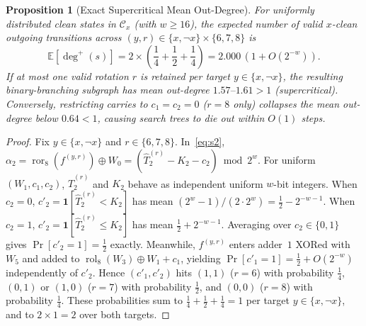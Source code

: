 \documentclass[11pt,a4paper]{article}
\newtheorem{proposition}[theorem]{Proposition}
\theoremstyle{definition}
\theoremstyle{remark}
\newcommand{\ror}{\operatorname{ror}}
\newcommand{\rol}{\operatorname{rol}}
\begin{document}
\begin{proposition}[Exact Supercritical Mean Out-Degree]
\label{prop:outdegree}
For uniformly distributed clean states in $\mathcal{C}_x$ (with $w \ge 16$), the expected number of valid $x$-clean outgoing transitions across $(y, r) \in \{x, \neg x\} \times \{6, 7, 8\}$ is
\[
    \mathbb{E}[\deg^+(s)] = 2 \times \left(\frac{1}{4} + \frac{1}{2} + \frac{1}{4}\right) = 2.000\,(1 + O(2^{-w})).
\]
If at most one valid rotation $r$ is retained per target $y \in \{x, \neg x\}$, the resulting binary-branching subgraph has mean out-degree $1.57\text{--}1.61 > 1$ (supercritical). Conversely, restricting carries to $c_1 = c_2 = 0$ ($r = 8$ only) collapses the mean out-degree below $0.64 < 1$, causing search trees to die out within $O(1)$ steps.
\end{proposition}

\begin{proof}
Fix $y \in \{x, \neg x\}$ and $r \in \{6, 7, 8\}$. In~\eqref{eq:s2}, $\alpha_2 = \ror_8(f^{(y,r)}) \oplus W_0 = (\hat{T}_2^{(r)} - K_2 - c_2) \bmod 2^w$. For uniform $(W_1, c_1, c_2)$, $\hat{T}_2^{(r)}$ and $K_2$ behave as independent uniform $w$-bit integers. When $c_2 = 0$, $c'_2 = \mathbf{1}[\hat{T}_2^{(r)} < K_2]$ has mean $(2^w - 1)/(2 \cdot 2^w) = \frac{1}{2} - 2^{-w-1}$. When $c_2 = 1$, $c'_2 = \mathbf{1}[\hat{T}_2^{(r)} \le K_2]$ has mean $\frac{1}{2} + 2^{-w-1}$. Averaging over $c_2 \in \{0,1\}$ gives $\Pr[c'_2 = 1] = \frac{1}{2}$ exactly. Meanwhile, $f^{(y,r)}$ enters adder~$1$ XORed with $W_5$ and added to $\rol_8(W_3) \oplus W_1 + c_1$, yielding $\Pr[c'_1 = 1] = \frac{1}{2} + O(2^{-w})$ independently of $c'_2$. Hence $(c'_1, c'_2)$ hits $(1,1)$ ($r=6$) with probability $\frac{1}{4}$, $(0,1)$ or $(1,0)$ ($r=7$) with probability $\frac{1}{2}$, and $(0,0)$ ($r=8$) with probability $\frac{1}{4}$. These probabilities sum to $\frac{1}{4} + \frac{1}{2} + \frac{1}{4} = 1$ per target $y \in \{x, \neg x\}$, and to $2 \times 1 = 2$ over both targets.
\end{proof}
\end{document}

